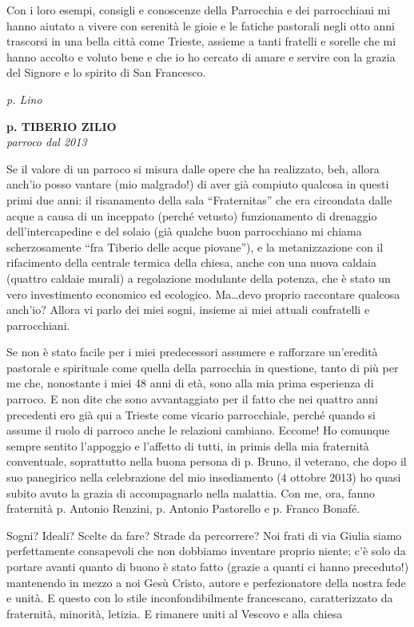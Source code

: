 Con i loro esempi, consigli e conoscenze della Parrocchia e dei parrocchiani mi hanno aiutato a 
vivere con serenità le gioie e le fatiche pastorali negli otto anni trascorsi in una bella città come 
Trieste, assieme a tanti fratelli e sorelle che mi hanno accolto e voluto bene e che io ho cercato di 
amare e servire con la grazia del Signore e lo spirito di San Francesco. 
\begin{flushright}
\textit{p. Lino}
\end{flushright}
\bigskip
\begin{center}
\textbf{\Large p. TIBERIO ZILIO}\\
	\textit{parroco dal 2013}
\end{center}
\bigbreak
Se il valore di un parroco si misura dalle opere che ha realizzato, beh, allora anch’io posso
vantare (mio malgrado!) di aver già compiuto qualcosa in questi primi due anni: il risanamento 
della sala “Fraternitas” che era circondata dalle acque a causa di un inceppato (perché vetusto) 
funzionamento di drenaggio dell’intercapedine e del solaio (già qualche buon parrocchiano mi 
chiama scherzosamente “fra Tiberio delle acque piovane”), e la metanizzazione con il rifacimento 
della centrale termica della chiesa, anche con una nuova caldaia (quattro caldaie murali) a 
regolazione modulante della potenza, che è stato un vero investimento economico ed ecologico. 
Ma…devo proprio raccontare qualcosa anch’io? Allora vi parlo dei miei sogni, insieme ai miei 
attuali confratelli e parrocchiani. 

Se non è stato facile per i miei predecessori assumere e rafforzare un’eredità pastorale e 
spirituale come quella della parrocchia in questione, tanto di più per me che, nonostante i miei 48 
anni di età, sono alla mia prima esperienza di parroco. E non dite che sono avvantaggiato per il fatto 
che nei quattro anni precedenti ero già qui a Trieste come vicario parrocchiale, perché quando si 
assume il ruolo di parroco anche le relazioni cambiano. Eccome! Ho comunque sempre sentito 
l’appoggio e l’affetto di tutti, in primis della mia fraternità conventuale, soprattutto nella buona 
persona di p. Bruno, il veterano, che dopo il suo panegirico nella celebrazione del mio insediamento 
(4 ottobre 2013) ho quasi subito avuto la grazia di accompagnarlo nella malattia. Con me, ora, 
fanno fraternità p. Antonio Renzini, p. Antonio Pastorello e p. Franco Bonafé. 

Sogni? Ideali? Scelte da fare? Strade da percorrere? Noi frati di via Giulia siamo 
perfettamente consapevoli che non dobbiamo inventare proprio niente; c’è solo da portare avanti 
quanto di buono è stato fatto (grazie a quanti ci hanno preceduto!) mantenendo in mezzo a noi Gesù 
Cristo, autore e perfezionatore della nostra fede e unità. E questo con lo stile inconfondibilmente 
francescano, caratterizzato da fraternità, minorità, letizia. E rimanere uniti al Vescovo e alla chiesa 

